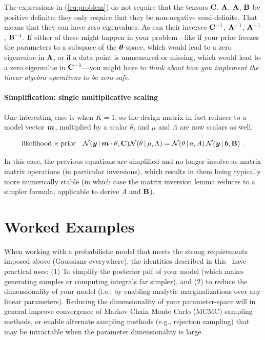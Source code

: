 The expressions in (\ref{eq:problem}) do not require that the tensors
$\mathbf{C}$, $\mathbf{\Lambda}$, $\mathbf{A}$, $\mathbf{B}$ be positive definite; they only require
that they be non-negative semi-definite.
That means that they can have zero eigenvalues.
As can their inverses $\mathbf{C}^{-1}$, $\mathbf{\Lambda}^{-1}$, $\mathbf{A}^{-1}$, $\mathbf{B}^{-1}$.
If either of these might happen in your problem---like if your prior
freezes the parameters to a subspace of the $\boldsymbol{\theta}$-space, which
would lead to a zero eigenvalue in $\mathbf{\Lambda}$, or if a data point is
unmeasured or missing, which would lead to a zero eigenvalue in
$\mathbf{C}^{-1}$---you might have to \emph{think about how you implement the
linear algebra operations to be zero-safe}.


\paragraph{Simplification: single multiplicative scaling}

One interesting case is when $K=1$, so the design matrix in fact reduces to a model vector $\boldsymbol{m}$, multiplied by a scalar $\theta$, and $\mu$ and $\Lambda$ are now scalars as well.

\begin{equation}
\mbox{likelihood} \times \mbox{prior} \quad \mathcal{N}\!\,(\boldsymbol{y}\,|\,\boldsymbol{m}\cdot\theta,\mathbf{C})\mathcal{N}\!\,(\theta\,|\, \mu, \Lambda) = \mathcal{N}\!\,(\theta\,|\, a,A)\,\mathcal{N}\!\,(\boldsymbol{y}\,|\,\boldsymbol{b},\mathbf{B})
~ .
\end{equation}

In this case, the previous equations are simplified and no longer involve as matrix matrix operations (in particular inversions), which results in them being typically more numerically stable (in which case the matrix inversion lemma reduces to a simpler formula, applicable to derive $A$ and $\mathbf{B}$).


\section{Worked Examples}

When working with a probabilistic model that meets the strong requirements
imposed above (Gaussians everywhere), the identities described in this
\documentname\ have practical uses: (1) To simplify the posterior pdf of your
model (which makes generating samples or computing integrals far simpler), and
(2) to reduce the dimensionality of your model (i.e., by enabling analytic
marginalizations over any linear parameters).
Reducing the dimensionality of your parameter-space will in general improve
convergence of Markov Chain Monte Carlo (MCMC) sampling methods, or enable
alternate sampling methods (e.g., rejection sampling) that may be intractable
when the parameter dimensionality is large.

